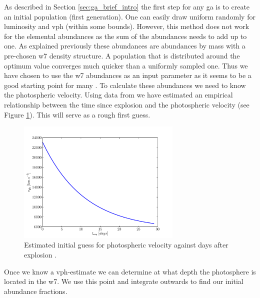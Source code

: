 As described in Section \ref{sec:ga_brief_intro} the first step for any \gls{ga} is to create an initial population (first generation). One can easily draw uniform randomly for luminosity and \gls{vph} (within some bounds). However, this method does not work for the elemental abundances as the sum of the abundances needs to add up to one. As explained previously these abundances are abundances by mass with a pre-chosen \gls{w7} density structure. A population that is distributed around the optimum value converges much quicker than a uniformly sampled one. Thus we have chosen to use the \gls{w7} abundances as an input parameter as it seems to be a good starting point for many \snia. To calculate these abundances we need to know the photospheric velocity. Using data from \citet{2005ApJ...623.1011B} we have estimated an empirical relationship between the time since explosion and the photospheric velocity (see Figure \ref{fig:texp_vph}). This will serve as a rough first guess.

\begin{figure}[htbp] %
   \centering
   \includegraphics[width=0.7\textwidth]{chapter_dalek/plots/plot_texp_vph.pdf} 
   \caption[Estimated initial guess for photospheric velocity against days after explosion]{Estimated initial guess for photospheric velocity against days after explosion \citep{2005ApJ...623.1011B}. }
   \label{fig:texp_vph}
\end{figure} 

Once we know a \gls{vph}-estimate we can determine at what depth the photosphere is located in the \gls{w7}. We use this point and integrate outwards to find our initial abundance fractions.

